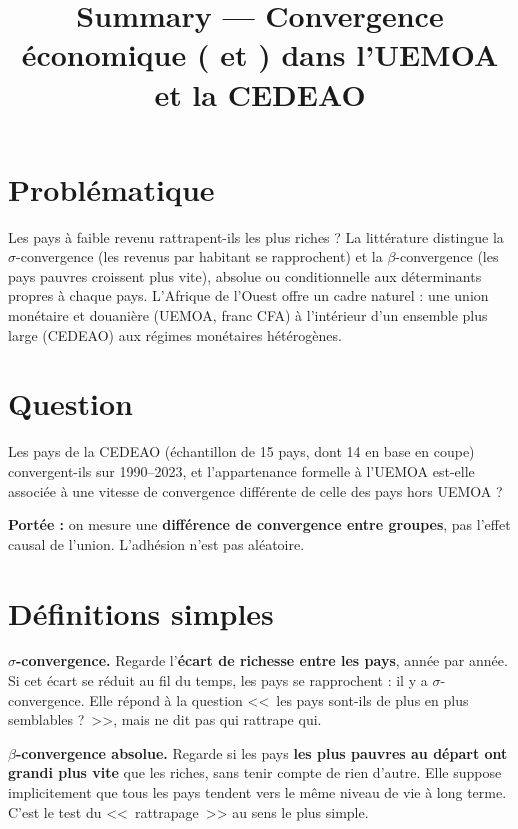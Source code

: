 \documentclass[14pt,a4paper]{article}
\title{\textbf{Summary --- Convergence économique (\sig{} et \bet{}) dans l'UEMOA et la CEDEAO}}
\author{}
\date{}
\newcommand{\sig}{\texorpdfstring{$\sigma$}{sigma}}
\newcommand{\bet}{\texorpdfstring{$\beta$}{beta}}
\begin{document}
	\maketitle
	
	\section{Problématique}
	
	Les pays à faible revenu rattrapent-ils les plus riches ? La littérature distingue la \sig-convergence (les revenus par habitant se rapprochent) et la \bet-convergence (les pays pauvres croissent plus vite), absolue ou conditionnelle aux déterminants propres à chaque pays. L'Afrique de l'Ouest offre un cadre naturel : une union monétaire et douanière (UEMOA, franc CFA) à l'intérieur d'un ensemble plus large (CEDEAO) aux régimes monétaires hétérogènes.
	
	\section{Question}
	
	Les pays de la CEDEAO (échantillon de 15 pays, dont 14 en base en coupe) convergent-ils sur 1990--2023, et l'appartenance formelle à l'UEMOA est-elle associée à une vitesse de convergence différente de celle des pays hors UEMOA ?
	
	\textbf{Portée :} on mesure une \textbf{différence de convergence entre groupes}, pas l'effet causal de l'union. L'adhésion n'est pas aléatoire.
	
	\section{Définitions simples}
	
	\textbf{\boldmath\sig-convergence.} Regarde l'\textbf{écart de richesse entre les pays}, année par année. Si cet écart se réduit au fil du temps, les pays se rapprochent : il y a \sig-convergence. Elle répond à la question <<~les pays sont-ils de plus en plus semblables ?~>>, mais ne dit pas qui rattrape qui.
	
	\textbf{\boldmath\bet-convergence absolue.} Regarde si les pays \textbf{les plus pauvres au départ ont grandi plus vite} que les riches, sans tenir compte de rien d'autre. Elle suppose implicitement que tous les pays tendent vers le même niveau de vie à long terme. C'est le test du <<~rattrapage~>> au sens le plus simple.
	
\end{document}
